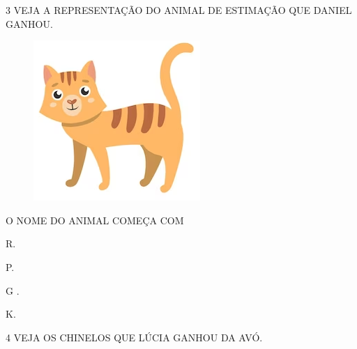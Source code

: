 \num{3} VEJA A REPRESENTAÇÃO DO ANIMAL DE ESTIMAÇÃO QUE DANIEL GANHOU.

\begin{minipage}{.4\textwidth}
\begin{figure}[H]
\includegraphics[width=\textwidth]{media/image187.png}
\end{figure}
\end{minipage}
\begin{minipage}{.5\textwidth}
O NOME DO ANIMAL COMEÇA COM 

\begin{escolha}
\item R.

\item P.

\item G .

\item K.
\end{escolha}
\end{minipage}

\vspace{0.5cm}

\num{4} VEJA OS CHINELOS QUE LÚCIA GANHOU DA AVÓ. 

